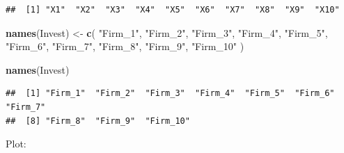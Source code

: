 \documentclass[
]{book}
\newenvironment{Shaded}{\begin{snugshade}}{\end{snugshade}}
\newcommand{\CommentTok}[1]{\textcolor[rgb]{0.56,0.35,0.01}{\textit{#1}}}
\newcommand{\FunctionTok}[1]{\textcolor[rgb]{0.13,0.29,0.53}{\textbf{#1}}}
\newcommand{\NormalTok}[1]{#1}
\newcommand{\OtherTok}[1]{\textcolor[rgb]{0.56,0.35,0.01}{#1}}
\newcommand{\SpecialCharTok}[1]{\textcolor[rgb]{0.81,0.36,0.00}{\textbf{#1}}}
\newcommand{\StringTok}[1]{\textcolor[rgb]{0.31,0.60,0.02}{#1}}
\begin{document}
\begin{Shaded}
\end{Shaded}

\begin{verbatim}
##  [1] "X1"  "X2"  "X3"  "X4"  "X5"  "X6"  "X7"  "X8"  "X9"  "X10"
\end{verbatim}

\begin{Shaded}
\begin{Highlighting}[]
\FunctionTok{names}\NormalTok{(Invest) }\OtherTok{\textless{}{-}} \FunctionTok{c}\NormalTok{( }\StringTok{"Firm\_1"}\NormalTok{, }\StringTok{"Firm\_2"}\NormalTok{, }\StringTok{"Firm\_3"}\NormalTok{, }\StringTok{"Firm\_4"}\NormalTok{, }
                    \StringTok{"Firm\_5"}\NormalTok{, }\StringTok{"Firm\_6"}\NormalTok{, }\StringTok{"Firm\_7"}\NormalTok{, }\StringTok{"Firm\_8"}\NormalTok{, }
                    \StringTok{"Firm\_9"}\NormalTok{, }\StringTok{"Firm\_10"}\NormalTok{ )}

\FunctionTok{names}\NormalTok{(Invest)}
\end{Highlighting}
\end{Shaded}

\begin{verbatim}
##  [1] "Firm_1"  "Firm_2"  "Firm_3"  "Firm_4"  "Firm_5"  "Firm_6"  "Firm_7" 
##  [8] "Firm_8"  "Firm_9"  "Firm_10"
\end{verbatim}

Plot:
\end{document}
